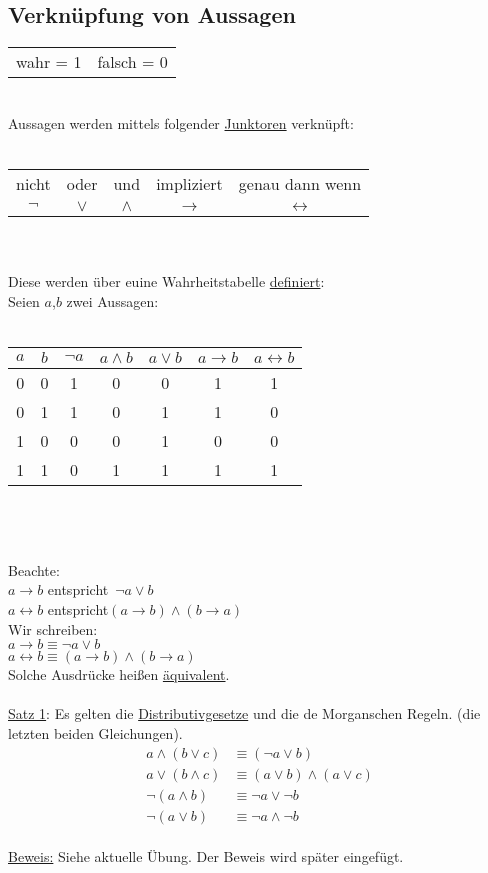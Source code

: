 \subsection{Verknüpfung von Aussagen}
\begin{tabular}{cc}
wahr = 1 & falsch = 0 \\  
\end{tabular} \\
Aussagen werden mittels folgender \underline{Junktoren} verknüpft:\\ \qquad\\
\begin{tabular}{ccccc}
nicht & oder & und & impliziert & genau dann wenn \\ 
$\neg$ & $\vee$ & $\wedge$ & $\rightarrow$ & $\leftrightarrow$ \\ 
\end{tabular} \\
\qquad\\
Diese werden über euine Wahrheitstabelle \underline{definiert}:\\
Seien $a$,$b$ zwei Aussagen:\\
\qquad\\
\begin{tabular}{|c|c||c|c|c|c|c|}
$a$ & $b$ & $\neg a$ & $a \wedge b$ & $a \vee b$ & $a \rightarrow b$ & $a \leftrightarrow b$ \\ 
 \hline 0 & 0 & 1 & 0 & 0 & 1 & 1 \\ 
0 &  1& 1 & 0 & 1 &  1& 0 \\ 
1 &  0& 0 & 0 &  1&  0& 0 \\ 
1 & 1 & 0 & 1 &  1& 1 & 1 \\ 
\end{tabular} \\
\qquad\\
\qquad\\
Beachte: \\
$a \rightarrow b$ \glqq entspricht\grqq ~$\neg a \vee b$\\
$a\leftrightarrow b$ \glqq entspricht\grqq $(a\rightarrow b) \wedge (b \rightarrow a)$\\
Wir schreiben:\\
$a \rightarrow b \equiv \neg a \vee b$\\
$a\leftrightarrow b \equiv (a\rightarrow b) \wedge (b \rightarrow a)$\\
Solche Ausdrücke heißen \underline{äquivalent}.\\
\qquad\\
\underline{Satz 1}: Es gelten die \underline{Distributivgesetze} und die de Morganschen Regeln. (die letzten beiden \glqq Gleichungen\grqq).
\begin{align*}
a \wedge ( b \vee c) & \equiv (\neg a \vee b)\\
a \vee ( b \wedge c) & \equiv (a\vee b) \wedge (a \vee c)\\
\neg (a \wedge b )  & \equiv \neg a \vee \neg b \\
\neg (a \vee b) & \equiv \neg a \wedge \neg b
\end{align*}\\
\underline{Beweis:} Siehe aktuelle Übung. Der Beweis wird später eingefügt.

